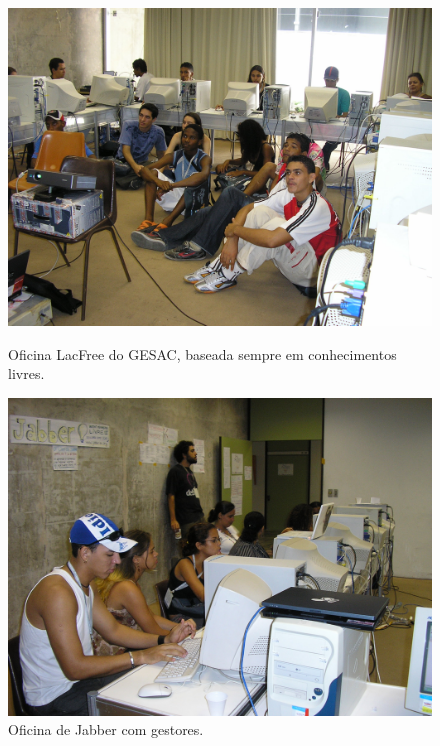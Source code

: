 \documentclass[
12pt,		%
openright,	%
twoside,  %
a4paper,			%
chapter=TITLE,		%
english,			%
french,				%
spanish,			%
brazil				%
]{USPSC-classe/USPSC}
\begin{document}
\begin{figure}[max size={\textwidth}{\textheight}]
\begin{minipage}[b]{0.4\linewidth}
                \includegraphics[width=1.0\linewidth]{../../imagens/oficinalac.JPG}
                \caption{Oficina LacFree do GESAC, baseada sempre em conhecimentos livres.}
                \label{350ae75fda8eb19905317e70b64079af869125d8}
\end{minipage}
\hspace{0.5cm}
\begin{minipage}[b]{0.4\linewidth}
        \centering
                \includegraphics[width=1.0\linewidth]{../../imagens/jabber.JPG}
                \caption{Oficina de Jabber com gestores.}
                \label{e29d9c3f5a4aa82fa420bc60ed161880a24bc2b6}
\end{minipage}%
\hspace{0.5cm}

\end{figure}
\end{document}
